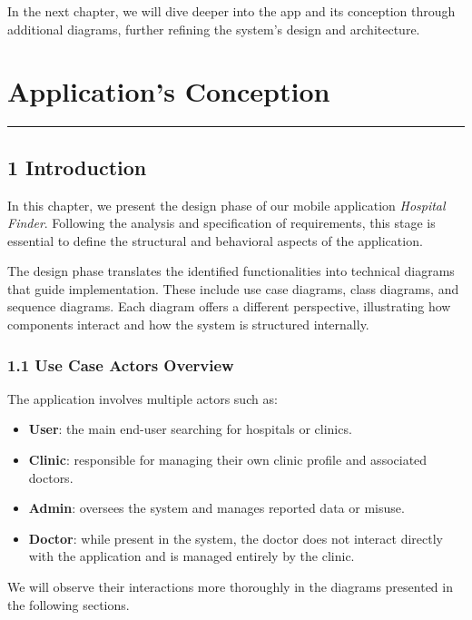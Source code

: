\documentclass[12pt]{report}
\begin{document}
\noindent In the next chapter, we will dive deeper into the app and its conception through additional diagrams, further refining the system's design and architecture.














\newpage

\chapter{\textbf{Application's Conception}}
\rule{\linewidth}{1.5pt}


\section*{\textbf{1 Introduction}}

\noindent In this chapter, we present the design phase of our mobile application \textit{Hospital Finder}. Following the analysis and specification of requirements, this stage is essential to define the structural and behavioral aspects of the application.

\noindent The design phase translates the identified functionalities into technical diagrams that guide implementation. These include use case diagrams, class diagrams, and sequence diagrams. Each diagram offers a different perspective, illustrating how components interact and how the system is structured internally.

\subsection*{1.1 Use Case Actors Overview}

\noindent The application involves multiple actors such as:

\begin{itemize}
	\item \textbf{User}: the main end-user searching for hospitals or clinics.
	\item \textbf{Clinic}: responsible for managing their own clinic profile and associated doctors.
	\item \textbf{Admin}: oversees the system and manages reported data or misuse.
	\item \textbf{Doctor}: while present in the system, the doctor does not interact directly with the application and is managed entirely by the clinic.
\end{itemize}
\newpage
\noindent We will observe their interactions more thoroughly in the diagrams presented in the following sections.
\end{document}
